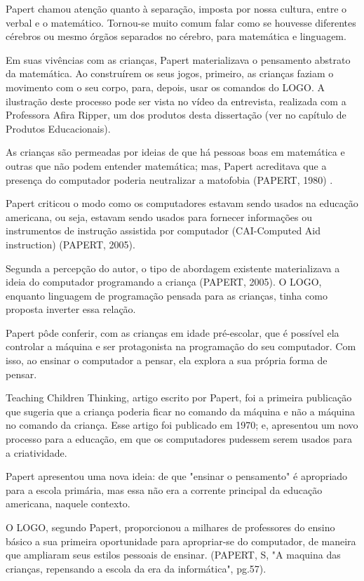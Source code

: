 Papert chamou atenção quanto à separação, imposta por nossa cultura, entre o verbal e o matemático. Tornou-se muito comum falar como se houvesse diferentes cérebros ou mesmo órgãos separados no cérebro, para matemática e linguagem.

Em suas vivências com as crianças, Papert materializava o pensamento abstrato da matemática. Ao construírem os seus jogos, primeiro, as crianças faziam o movimento com o seu corpo, para, depois, usar os comandos do LOGO. A ilustração deste processo pode ser vista no vídeo  da entrevista, realizada com a Professora Afira Ripper,  um dos produtos desta dissertação (ver no capítulo de Produtos Educacionais).

As crianças são permeadas por ideias de que há pessoas boas em matemática e outras que não podem entender matemática; mas, Papert acreditava que a presença do computador poderia neutralizar a matofobia (PAPERT, 1980) .

Papert criticou o modo como os computadores estavam sendo usados na educação americana, ou seja, estavam sendo usados para fornecer informações ou instrumentos de instrução assistida por computador (CAI-Computed Aid instruction)  (PAPERT, 2005).

Segunda a percepção do autor, o tipo de abordagem existente materializava a ideia do computador programando a criança (PAPERT, 2005). O LOGO, enquanto linguagem de programação pensada para as crianças, tinha como proposta inverter essa relação.

Papert pôde conferir, com as crianças em idade pré-escolar, que é possível ela controlar a máquina e ser protagonista na programação do seu computador. Com isso, ao ensinar o computador a pensar, ela explora a sua própria forma de pensar.

Teaching Children Thinking, artigo escrito por Papert, foi a primeira publicação que sugeria que a criança poderia ficar no comando da máquina e não a máquina no comando da criança.  Esse artigo  foi publicado em 1970; e,  apresentou um novo processo para a educação, em que os computadores pudessem serem usados para a criatividade.

Papert apresentou uma nova ideia: de que "ensinar o pensamento"  é apropriado para a escola primária, mas essa não era a corrente principal da educação americana, naquele contexto.

O LOGO, segundo Papert, proporcionou a milhares de professores do ensino básico a sua primeira oportunidade para apropriar-se do computador, de maneira que ampliaram seus estilos pessoais de ensinar. (PAPERT, S, "A maquina das crianças, repensando a escola da era da informática", pg.57).

